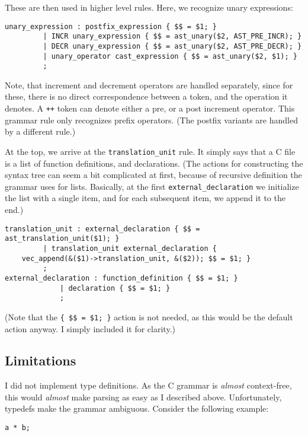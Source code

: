 \documentclass[12pt]{article}
\begin{document}
These are then used in higher level rules. Here, we recognize unary
expressions:
\begin{center}
\begin{BVerbatim}
unary_expression : postfix_expression { $$ = $1; }
		 | INCR unary_expression { $$ = ast_unary($2, AST_PRE_INCR); }
		 | DECR unary_expression { $$ = ast_unary($2, AST_PRE_DECR); }
		 | unary_operator cast_expression { $$ = ast_unary($2, $1); }
		 ;
\end{BVerbatim}
\end{center}
Note, that increment and decrement operators are handled separately, since for
these, there is no direct correspondence between a token, and the operation it
denotes. A \texttt{++} token can denote either a pre, or a post increment
operator. This grammar rule only recognizes prefix operators.  (The postfix
variants are handled by a different rule.)

At the top, we arrive at the \texttt{translation\_unit} rule. It simply says
that a C file is a list of function definitions, and declarations. (The actions
for constructing the syntax tree can seem a bit complicated at first, because
of recursive definition the grammar uses for lists. Basically, at the first
\texttt{external\_declaration} we initialize the list with a single item, and
for each subsequent item, we append it to the end.)
\begin{center}
\begin{BVerbatim}
translation_unit : external_declaration { $$ = ast_translation_unit($1); }
		 | translation_unit external_declaration {
	vec_append(&($1)->translation_unit, &($2)); $$ = $1; }
		 ;
external_declaration : function_definition { $$ = $1; }
		     | declaration { $$ = $1; }
		     ;
\end{BVerbatim}
\end{center}
(Note that the \verb|{ $$ = $1; }| action is not needed, as this would be the
default action anyway. I simply included it for clarity.)

\subsection{Limitations}
I did not implement type definitions. As the C grammar is \emph{almost}
context-free, this would \emph{almost} make parsing as easy as I described
above. Unfortunately, typedefs make the grammar ambiguous. Consider the
following example:
\begin{center}
\begin{BVerbatim}
a * b;
\end{BVerbatim}
\end{center}
\end{document}
